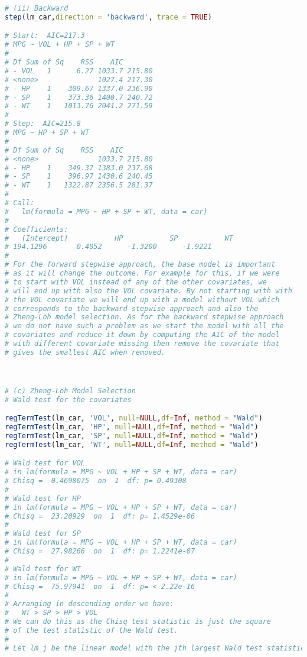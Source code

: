\documentclass[a4paper,10pt]{article}
\theoremstyle{definition}
\begin{document}
\begin{enumerate}
\begin{lstlisting}[language=R,commentstyle=\fontseries{lc}\color{gray}]
# (ii) Backward
step(lm_car,direction = 'backward', trace = TRUE)

# Start:  AIC=217.3
# MPG ~ VOL + HP + SP + WT
# 
# Df Sum of Sq    RSS    AIC
# - VOL   1      6.27 1033.7 215.80
# <none>              1027.4 217.30
# - HP    1    309.67 1337.0 236.90
# - SP    1    373.36 1400.7 240.72
# - WT    1   1013.76 2041.2 271.59
# 
# Step:  AIC=215.8
# MPG ~ HP + SP + WT
# 
# Df Sum of Sq    RSS    AIC
# <none>              1033.7 215.80
# - HP    1    349.37 1383.0 237.68
# - SP    1    396.97 1430.6 240.45
# - WT    1   1322.87 2356.5 281.37
# 
# Call:
#   lm(formula = MPG ~ HP + SP + WT, data = car)
# 
# Coefficients:
#   (Intercept)           HP           SP           WT  
# 194.1296       0.4052      -1.3200      -1.9221  
# 
# For the forward stepwise approach, the base model is important
# as it will change the outcome. For example for this, if we were
# to start with VOL instead of any of the other covariates, we 
# will end up with also the VOL covariate. By not starting with with
# the VOL covariate we will end up with a model without VOL which 
# corresponds to the backward stepwise approach and also the 
# Zheng-Loh model selection. As for the backward stepwise approach
# we do not have such a problem as we start the model with all the 
# covariates and reduce it down by computing the AIC of the model
# with different covariate missing then remove the covariate that 
# gives the smallest AIC when removed.



# (c) Zheng-Loh Model Selection
# Wald test for the covariates

regTermTest(lm_car, 'VOL', null=NULL,df=Inf, method = "Wald")
regTermTest(lm_car, 'HP', null=NULL,df=Inf, method = "Wald")
regTermTest(lm_car, 'SP', null=NULL,df=Inf, method = "Wald")
regTermTest(lm_car, 'WT', null=NULL,df=Inf, method = "Wald")

# Wald test for VOL
# in lm(formula = MPG ~ VOL + HP + SP + WT, data = car)
# Chisq =  0.4698075  on  1  df: p= 0.49308 
# 
# Wald test for HP
# in lm(formula = MPG ~ VOL + HP + SP + WT, data = car)
# Chisq =  23.20929  on  1  df: p= 1.4529e-06 
# 
# Wald test for SP
# in lm(formula = MPG ~ VOL + HP + SP + WT, data = car)
# Chisq =  27.98266  on  1  df: p= 1.2241e-07 
# 
# Wald test for WT
# in lm(formula = MPG ~ VOL + HP + SP + WT, data = car)
# Chisq =  75.97941  on  1  df: p= < 2.22e-16
# 
# Arranging in descending order we have:
#   WT > SP > HP > VOL
# We can do this as the Chisq test statistic is just the square 
# of the test statistic of the Wald test.
# 
# Let lm_j be the linear model with the jth largest Wald test statistic


\end{lstlisting}
\end{enumerate}
\end{document}
